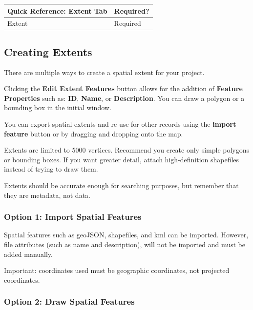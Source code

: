 \documentclass[
]{book}
\begin{document}
\begin{longtable}[]{@{}ll@{}}
\toprule
Quick Reference: Extent Tab & Required?\tabularnewline
\midrule
\endhead
Extent & Required\tabularnewline
\bottomrule
\end{longtable}

\hypertarget{creating-extents}{%
\subsection*{Creating Extents}\label{creating-extents}}

There are multiple ways to create a spatial extent for your project.

Clicking the \textbf{Edit Extent Features} button allows for the addition of \textbf{Feature Properties} such as: \textbf{ID}, \textbf{Name}, or \textbf{Description}. You can draw a polygon or a bounding box in the initial window.

You can export spatial extents and re-use for other records using the \textbf{import feature} button or by dragging and dropping onto the map.

Extents are limited to 5000 vertices. Recommend you create only simple polygons or bounding boxes. If you want greater detail, attach high-definition shapefiles instead of trying to draw them.

Extents should be accurate enough for searching purposes, but remember that they are metadata, not data.

\hypertarget{option-1-import-spatial-features}{%
\subsubsection*{Option 1: Import Spatial Features}\label{option-1-import-spatial-features}}

Spatial features such as geoJSON, shapefiles, and kml can be imported. However, file attributes (such as name and description), will not be imported and must be added manually.

Important: coordinates used must be geographic coordinates, not projected coordinates.

\hypertarget{option-2-draw-spatial-features}{%
\subsubsection*{Option 2: Draw Spatial Features}\label{option-2-draw-spatial-features}}
\end{document}
